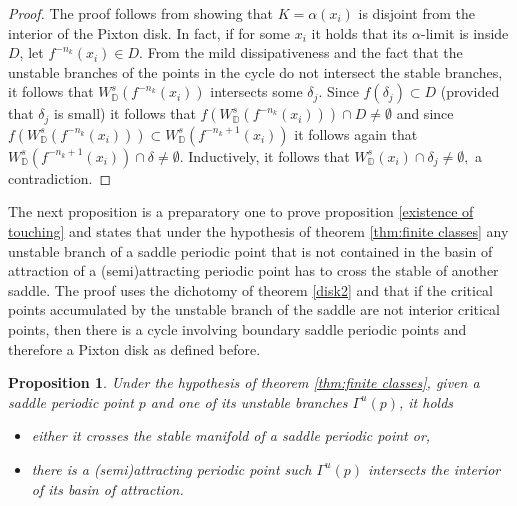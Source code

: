 \documentclass[a4paper,11pt]{article}
\newtheorem{proposition}[lemma]{Proposition}
\theoremstyle{definition}
\def\DD{{\mathbb D}}
\def\Ga{\Gamma}
\def\de{\delta}
\def\Ga{\Gamma}
\begin{document}
 \begin{proof}
     
The proof follows from showing that $K=\alpha(x_i)$ is disjoint from the interior of the Pixton disk. In fact, if for some $x_i$ it holds that its $\alpha$-limit is inside $D$, let $f^{-n_k}(x_i)\in D$. From the mild dissipativeness and the fact that the unstable branches of the points in the cycle  do not intersect the stable branches, it follows that $W^s_\DD(f^{-n_k}(x_i))$ intersects some $\de_j$. Since $f(\de_j)\subset D$ (provided that $\de_j$ is small) it follows that $f(W^s_\DD(f^{-n_k}(x_i)))\cap D\neq\emptyset$ and since $f(W^s_\DD(f^{-n_k}(x_i)))\subset W^s_\DD(f^{-n_k+1}(x_i))$ it follows again that $W^s_\DD(f^{-n_k+1}(x_i))\cap \de\neq \emptyset.$ Inductively, it follows that $W^s_\DD(x_i)\cap \de_j\neq \emptyset,$ a contradiction.
\end{proof}

The next proposition is a preparatory one to prove proposition \ref{existence of touching} and states that under the hypothesis of theorem \ref{thm:finite classes} any unstable branch of a saddle periodic point that is not contained  in the basin of attraction of a (semi)attracting periodic point has to cross the stable of another saddle. The proof uses the dichotomy of  theorem \ref{disk2} and that if the critical points accumulated by the unstable branch of the saddle are not interior critical points, then there is a cycle involving boundary saddle periodic points and therefore a Pixton disk as defined before. 

\begin{proposition} \label{prop trans} Under the hypothesis of theorem \ref{thm:finite classes},  given a saddle periodic point $p$  and one of its unstable branches $\Ga^u(p)$, it holds  

\begin{itemize}
  \item[--] either it  crosses the stable manifold   of a saddle periodic point or, 

 \item[--] there is a (semi)attracting periodic point such $\Ga^u(p)$   intersects the interior of its  basin of attraction.
    
\end{itemize}



    
\end{proposition}
\end{document}
